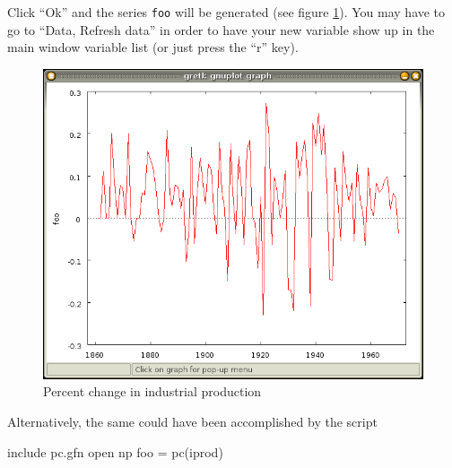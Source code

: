 Click ``Ok'' and the
series \texttt{foo} will be generated (see figure \ref{fig:iprod_pc}).
You may have to go to ``Data, Refresh data'' in order to have your new
variable show up in the main window variable list (or just press the
``r'' key).

\begin{figure}[htbp]
  \centering
  \includegraphics[scale=0.5]{figures/iprod_pc}
  \caption{Percent change in industrial production}
  \label{fig:iprod_pc}
\end{figure}

Alternatively, the same could have been accomplished by the script
\begin{code}
include pc.gfn
open np
foo = pc(iprod)
\end{code}



